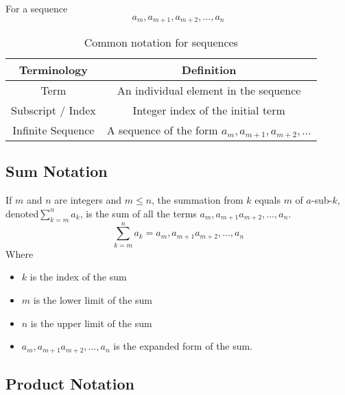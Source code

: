 \documentclass[11pt]{article}
\begin{document}
For a sequence
\begin{equation*}
    a_m, a_{m+1}, a_{m+2}, ... , a_n
\end{equation*}

\begin{table}[!htbp]
    \centering
    \begin{tabular}{ *{2}{c} }
        \toprule
        Terminology & Definition \\
        \midrule
        Term                & An individual element in the sequence \\
        Subscript / Index   & Integer index of the initial term \\
        Infinite Sequence   & A sequence of the form $a_m, a_{m+1}, a_{m+2}, ...$ \\
        \bottomrule
    \end{tabular}
    \label{tab:tbl-sequence-notation}
    \caption{Common notation for sequences}
\end{table}

\subsection{Sum Notation}

\begin{definition}[Sum]\label{def:sum}
    If $m$ and $n$ are integers and $m \leq n$, the summation
    from $k$ equals $m$ of $a$-sub-$k$, denoted$\sum_{k=m}^n a_k$,
    is the sum of all the terms $a_m, a_{m+1} a_{m+2}, ..., a_n$.
    \begin{equation*}
        \sum_{k=m}^n a_k = a_m, a_{m+1} a_{m+2}, ..., a_n
    \end{equation*}
    Where
    \begin{itemize}
        \item $k$ is the index of the sum
        \item $m$ is the lower limit of the sum
        \item $n$ is the upper limit of the sum
        \item $a_m, a_{m+1} a_{m+2}, ..., a_n$ is the expanded form of the sum.
    \end{itemize}
\end{definition}


\subsection{Product Notation}
\end{document}
